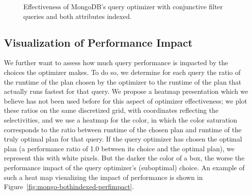 \begin{figure*}[t]
\newlength\plotheight%
\setlength{}
    \centering
    \hfill
    \hfill
    \vspace*{-0.75\baselineskip}
    \caption{Effectiveness of MongoDB's query optimizer with conjunctive filter queries and both attributes indexed.}
    \label{fig:bothindexed-evaluation}
\end{figure*}

\subsection{Visualization of Performance Impact}
We further want to assess how much query performance is impacted by the choices the optimizer makes. To do so, we determine for each query the ratio of the runtime of the plan chosen by the optimizer to the runtime of the plan that actually runs fastest for that query. We propose a heatmap presentation which we believe has not been used before for this aspect of optimizer effectiveness; we plot these ratios on the same discretized grid, with coordinates reflecting the selectivities, and we use a heatmap for the color, in which the color saturation corresponds to the ratio between runtime of the chosen plan and runtime of the truly optimal plan for that query.  If the query optimizer has chosen the optimal plan (a performance ratio of 1.0 between its choice and the optimal plan), we represent this with white pixels. 
But the darker the color of a box, the worse the performance impact of the query optimizer's (suboptimal) choice. An example of such a heat map visualizing the impact of \approachName performance is shown in Figure~\ref{fig:mongo-bothindexed-perfimpact}.

